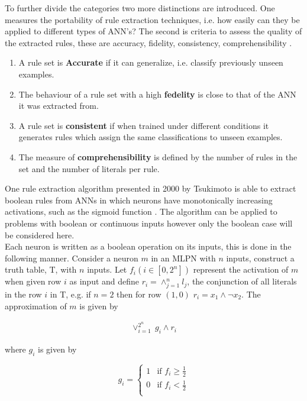 To further divide the categories two more distinctions are introduced. One measures the portability of rule extraction techniques, i.e. how easily can they be applied to different types of ANN's? The second is criteria to assess the quality of the extracted rules, these are accuracy, fidelity, consistency, comprehensibility \cite{andrews1995survey}.

\begin{enumerate}
\item A rule set is \textbf{Accurate} if it can generalize, i.e. classify previously unseen examples.
\item The behaviour of a rule set with a high \textbf{fedelity} is close to that of the ANN it was extracted from.
\item A rule set is \textbf{consistent} if when trained under different conditions it generates rules which assign the same classifications to unseen examples.
\item The measure of \textbf{comprehensibility} is defined by the number of rules in the set and the number of literals per rule.
\end{enumerate}

One rule extraction algorithm presented in 2000 by Tsukimoto is able to extract boolean rules from ANNs in which neurons have monotonically increasing activations, such as the sigmoid function \cite{tsukimoto2000extracting}. The algorithm can be applied to problems with boolean or continuous inputs however only the boolean case will be considered here.\\

Each neuron is written as a boolean operation on its inputs, this is done in the following manner. Consider a neuron $m$ in an MLPN with $n$ inputs, construct a truth table, T, with $n$ inputs. Let $f_i (i \in [0, 2^n])$ represent the activation of $m$ when given row $i$ as input and define $r_i = \land_{j=1}^{n} l_j$, the conjunction of all literals in the row $i$ in T, e.g. if $n=2$ then for row $(1,0)$ $r_i = x_1 \land \lnot x_2$. The approximation of $m$ is given by 

\begin{align}
	\lor_{i=1}^{2^n}\ g_i \land r_i
\end{align}

where $g_i$ is given by

\[
g_i =
\begin{cases}
1 & \text{if $f_i \geq \frac{1}{2}$} \\
0 & \text{if $f_i < \frac{1}{2}$} \\
\end{cases}
\]

